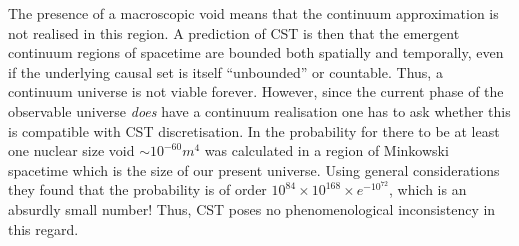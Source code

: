 The presence of a macroscopic void means that the continuum approximation is not realised in this region. A prediction
of CST is then that  the emergent continuum regions of spacetime are 
bounded both spatially and temporally, even if the underlying causal set is itself ``unbounded'' or countable. Thus, a continuum universe is not
viable forever. However, since the current phase of the observable universe \emph{does} have a continuum realisation one
has to ask whether this is compatible with CST discretisation.  In \cite{swerves} the
probability for there to be  at least one  nuclear size void  $ \sim 10^{-60}m^4 $ was calculated in a region of Minkowski spacetime
which is  the size of our present universe.  Using general considerations they found that the probability is of order $ 10^{84}
\times 10^{168} \times e^{-{10^{72}}}$, which is an absurdly small number!  Thus, CST poses no phenomenological inconsistency in
this regard. 

